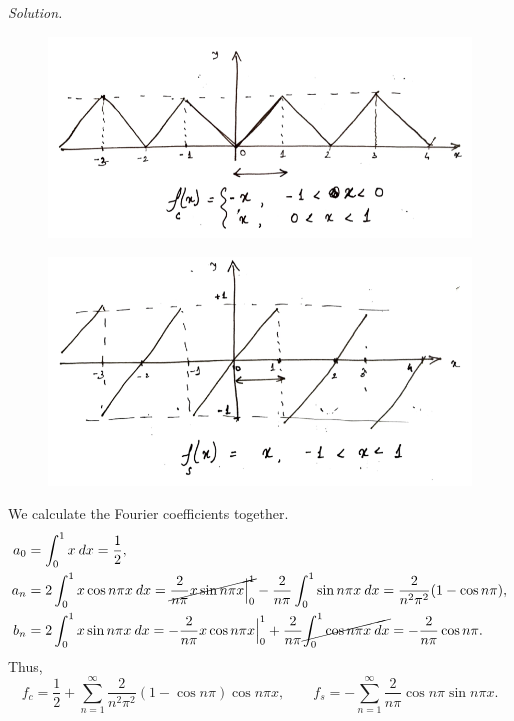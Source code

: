 \documentclass[10pt]{article}
\begin{document}
        \textit{Solution.}
        \begin{figure}[H]
                \centering        
                \includegraphics[scale=0.5]{./7_15_fc.png}
        \end{figure}
        \begin{figure}[H]
                \centering        
                \includegraphics[scale=0.5]{./7_15_fs.png}
        \end{figure}
         We calculate the Fourier coefficients together.
        \begin{align*}
                a_0 &= \int_0^1 x\:dx = \frac{1}{2}, \\
                a_n &= 2\int_0^1 x\cos{n\pi x}\:dx = \cancel{\frac{2}{n\pi}x\sin{n\pi x}\Big|_0^1} - \frac{2}{n\pi}\int_0^1 \sin{n\pi x}\:dx
                        = \frac{2}{n^2\pi^2}(1 - \cos{n\pi}), \\
                b_n &= 2\int_0^1 x\sin{n\pi x}\:dx = -\frac{2}{n\pi}x\cos{n\pi x}\Big|_0^1 + \frac{2}{n\pi}\cancel{\int_0^1 \cos{n\pi x}\:dx}
                        = -\frac{2}{n\pi}\cos{n\pi}.
        \end{align*}
        Thus,
        \[
                f_c = \frac{1}{2} + \sum_{n = 1}^\infty \frac{2}{n^2\pi^2}(1 - \cos{n\pi})\cos{n\pi x}, \qquad
                f_s = -\sum_{n = 1}^\infty \frac{2}{n\pi}\cos{n\pi}\sin{n\pi x}.
        \]
\end{document}
